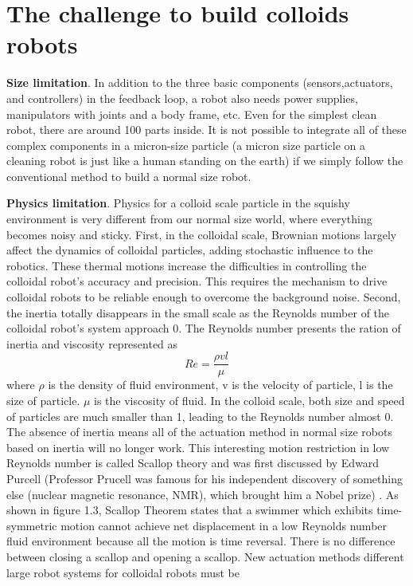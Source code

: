 \section{The challenge to  build colloids robots}

\textbf{Size limitation}. In addition to the three basic components (sensors,actuators, and controllers) in the feedback loop, a robot also needs power supplies, manipulators with joints and a body frame, etc. Even for the simplest clean robot, there are around 100 parts inside. It is not possible to integrate all of these complex components in a micron-size particle (a micron size particle on a cleaning robot is just like a human standing on the earth)  if we simply follow the conventional method to build a normal size robot. 

\textbf{Physics limitation}. Physics for a colloid scale particle in the squishy  environment is very different from our normal size world, where everything becomes noisy and sticky. First, in the colloidal scale, Brownian motions largely affect the dynamics of colloidal particles, adding stochastic influence to the robotics. These thermal motions increase the difficulties in controlling the colloidal robot's accuracy and precision. This requires the mechanism to drive colloidal robots to be reliable enough to overcome the background noise. Second, the inertia totally disappears in the small scale as the Reynolds number of the colloidal robot's system approach 0.  The Reynolds number presents the ration of inertia and viscosity represented as
\begin{equation}
    Re=\frac{\rho v l}{\mu}
\end{equation}
where $\rho $ is the density of fluid environment, v is the velocity of particle, l is the size of particle. $\mu$ is the  viscosity of fluid. In the colloid scale, both size and speed of particles are much smaller than 1, leading to the Reynolds number almost 0. The absence of inertia means all of the actuation method in normal size robots based on inertia will no longer work. This interesting  motion restriction in low Reynolds number is called Scallop
theory and was first discussed by Edward Purcell (Professor Prucell was famous for his independent discovery of something else (nuclear magnetic resonance, NMR), which brought him a Nobel prize) \autocite{purcell1977life}. As shown in figure 1.3, Scallop Theorem states that a swimmer which exhibits time-symmetric motion cannot achieve net displacement in a low Reynolds number fluid environment because all the motion is time reversal. There is no difference between closing a scallop and opening a scallop. New actuation methods different large robot systems for colloidal robots must be 

